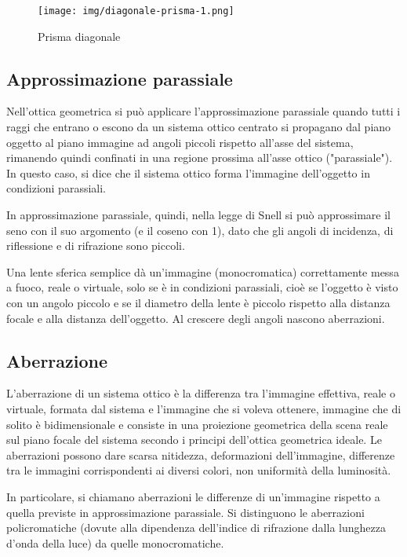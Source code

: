 \begin{figure}

\centering
\texttt{[image: img/diagonale-prisma-1.png]}

\caption{Prisma diagonale}
\label{fig:specchio-diagonale}
\end{figure}


\subsection{Approssimazione parassiale} 
Nell'ottica geometrica si può applicare l'approssimazione parassiale quando
tutti i raggi che entrano o escono da un sistema ottico centrato si propagano
dal piano oggetto al piano immagine ad angoli piccoli rispetto all'asse del
sistema, rimanendo quindi confinati in una regione prossima all’asse ottico
("parassiale"). In questo caso, si dice che il sistema ottico forma l’immagine
dell’oggetto in condizioni parassiali.

In approssimazione parassiale, quindi, nella legge di Snell si può
approssimare il seno con il suo argomento (e il coseno con 1), dato che gli
angoli di incidenza, di riflessione e di rifrazione sono piccoli.

Una lente sferica semplice dà un'immagine (monocromatica) correttamente messa
a fuoco, reale o virtuale, solo se è in condizioni parassiali, cioè se
l'oggetto è visto con un angolo piccolo e se il diametro della lente è piccolo
rispetto alla distanza focale e alla distanza dell'oggetto. Al crescere degli
angoli nascono aberrazioni.

\subsection{Aberrazione}
L'aberrazione di un sistema ottico è la differenza tra l'immagine effettiva,
reale o virtuale, formata dal sistema e l'immagine che si voleva ottenere,
immagine che di solito è bidimensionale e consiste in una proiezione
geometrica della scena reale sul piano focale del sistema secondo i principi
dell'ottica geometrica ideale. Le aberrazioni possono dare scarsa nitidezza,
deformazioni dell'immagine, differenze tra le immagini corrispondenti ai
diversi colori, non uniformità della luminosità.

In particolare, si chiamano aberrazioni le differenze di un'immagine rispetto
a quella previste in approssimazione parassiale. Si distinguono le aberrazioni
policromatiche (dovute alla dipendenza dell'indice di rifrazione dalla
lunghezza d'onda della luce) da quelle monocromatiche.

